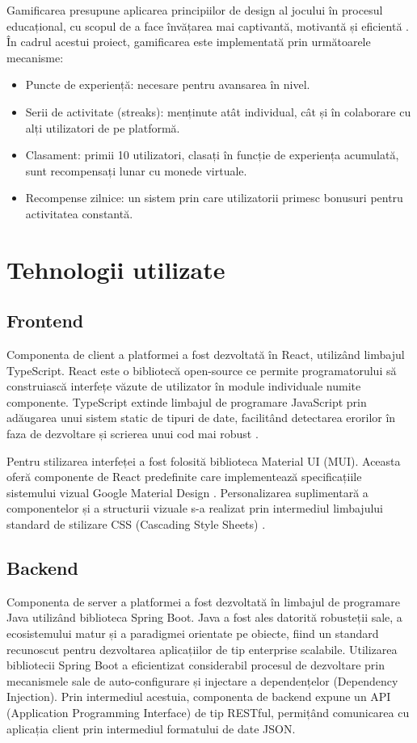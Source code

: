 Gamificarea presupune aplicarea principiilor de design al jocului în procesul educațional, cu scopul de a face învățarea mai captivantă, motivantă și eficientă \cite{apetrei2025}. În cadrul acestui proiect, gamificarea este implementată prin următoarele mecanisme:
\begin{itemize}
    \item Puncte de experiență: necesare pentru avansarea în nivel.
    \item Serii de activitate (streaks): menținute atât individual, cât și în colaborare cu alți utilizatori de pe platformă.
    \item Clasament: primii 10 utilizatori, clasați în funcție de experiența acumulată, sunt recompensați lunar cu monede virtuale.
    \item Recompense zilnice: un sistem prin care utilizatorii primesc bonusuri pentru activitatea constantă.
\end{itemize}

\section{Tehnologii utilizate}
\subsection{Frontend}

Componenta de client a platformei a fost dezvoltată în React, utilizând limbajul TypeScript. React este o bibliotecă open-source ce permite programatorului să construiască interfețe văzute de utilizator în module individuale numite componente. TypeScript extinde limbajul de programare JavaScript prin adăugarea unui sistem static de tipuri de date, facilitând detectarea erorilor în faza de dezvoltare și scrierea unui cod mai robust \cite{typescript2026}.  

Pentru stilizarea interfeței a fost folosită biblioteca Material UI (MUI). Aceasta oferă componente de React predefinite care implementează specificațiile sistemului vizual Google Material Design \cite{mui2026}. Personalizarea suplimentară a componentelor și a structurii vizuale s-a realizat prin intermediul limbajului standard de stilizare CSS (Cascading Style Sheets) \cite{w3c_css}.

\subsection{Backend}

Componenta de server a platformei a fost dezvoltată în limbajul de programare Java utilizând biblioteca Spring Boot. Java a fost ales datorită robusteții sale, a ecosistemului matur și a paradigmei orientate pe obiecte, fiind un standard recunoscut pentru dezvoltarea aplicațiilor de tip enterprise scalabile. Utilizarea bibliotecii Spring Boot a eficientizat considerabil procesul de dezvoltare prin mecanismele sale de auto-configurare și injectare a dependențelor (Dependency Injection). Prin intermediul acestuia, componenta de backend expune un API (Application Programming Interface) de tip RESTful, permițând comunicarea cu aplicația client prin intermediul formatului de date JSON.

